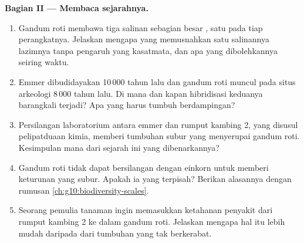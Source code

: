 \begin{problem}
\medskip
\noindent\textbf{Bagian II --- Membaca sejarahnya.}
\begin{enumerate}[resume]
  \item Gandum roti membawa tiga salinan sebagian besar , satu
        pada tiap perangkatnya. Jelaskan mengapa  yang memusnahkan
        satu salinannya lazimnya tanpa pengaruh yang kasatmata, dan apa
        yang dibolehkannya seiring waktu.
  \item Emmer dibudidayakan 10\,000 tahun lalu dan gandum roti muncul
        pada situs arkeologi 8\,000 tahun lalu. Di mana dan kapan
        hibridisasi keduanya barangkali terjadi? Apa yang harus tumbuh
        berdampingan?
  \item Persilangan laboratorium antara emmer dan rumput kambing 2,
        yang disusul pelipatduaan kimia, memberi tumbuhan subur yang
        menyerupai gandum roti. Kesimpulan mana dari sejarah ini yang
        dibenarkannya?
  \item Gandum roti tidak dapat bersilangan dengan einkorn untuk
        memberi keturunan yang subur. Apakah ia  yang terpisah?
        Berikan alasannya dengan rumusan \cref{ch:g10:biodiversity-scales}.
  \item Seorang pemulia tanaman ingin memasukkan  ketahanan penyakit
        dari rumput kambing 2 ke dalam gandum roti. Jelaskan mengapa
        hal itu lebih mudah daripada dari tumbuhan yang tak berkerabat.
\end{enumerate}


\end{problem}
